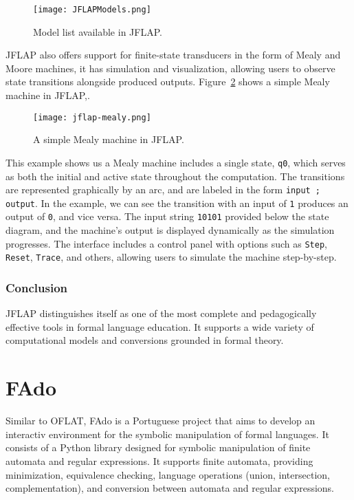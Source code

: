 \begin{figure}[H]
  \centering
  \texttt{[image: JFLAPModels.png]}
  \caption{Model list available in JFLAP.}
  \label{fig:JFLAPModels}
\end{figure}

JFLAP also offers support for finite-state transducers in the form of Mealy and Moore machines, it has simulation and visualization, allowing users
to observe state transitions alongside produced outputs.
Figure~\ref{fig:jflap-mealy} shows a simple Mealy machine in JFLAP,.

\begin{figure}[H]
  \centering
  \texttt{[image: jflap-mealy.png]}
  \caption{A simple Mealy machine in JFLAP.}
  \label{fig:jflap-mealy}
\end{figure}

This example shows us a Mealy machine includes a single state, \texttt{q0}, which serves as both the initial and active state throughout the computation. 
The transitions are represented graphically by an arc, and are labeled in the form \texttt{input ; output}. In the example, we can see the transition with
an input of \texttt{1} produces an output of \texttt{0}, and vice versa. The input string \texttt{10101} 
provided below the state diagram, and the machine's output is displayed dynamically as the simulation progresses. 
The interface includes a control panel with options such as \texttt{Step}, \texttt{Reset}, \texttt{Trace}, and others, allowing users to simulate the machine step-by-step.

\subsubsection*{Conclusion}
JFLAP distinguishes itself as one of the most complete and pedagogically effective tools in formal language education. 
It supports a wide variety of computational models and conversions grounded in formal theory. 

\section{FAdo}
Similar to OFLAT, FAdo\cite{FAdo} is a Portuguese project that aims to develop an interactiv environment for the symbolic manipulation of formal languages. 
It consists of a Python library designed for symbolic manipulation of finite automata and regular expressions. 
It supports finite automata, providing minimization, equivalence checking, language operations 
(union, intersection, complementation), and conversion between automata and regular expressions.

